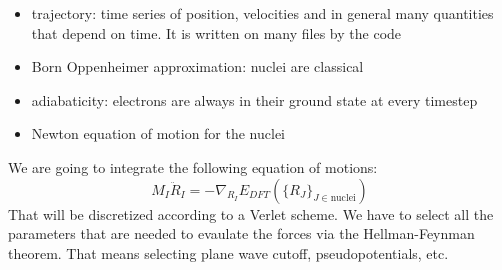 \documentclass[landscape]{foils}
\begin{document}
\begin{itemize}
\item trajectory: time series of position, velocities and in general many quantities that depend on time. It is written on many files by the code
\item Born Oppenheimer approximation: nuclei are classical
\item adiabaticity: electrons are always in their ground state at every timestep
\item Newton equation of motion for the nuclei
\end{itemize}

We are going to integrate the following equation of motions:
\begin{equation}
	M_I\ddot R_I = -\nabla_{R_I} E_{DFT}(\{R_J\}_{J\in\text{nuclei}})
\end{equation}
That will be discretized according to a Verlet scheme. We have to select all the parameters that are needed to evaulate the forces via the Hellman-Feynman theorem.
That means selecting plane wave cutoff, pseudopotentials, etc.
\end{document}
